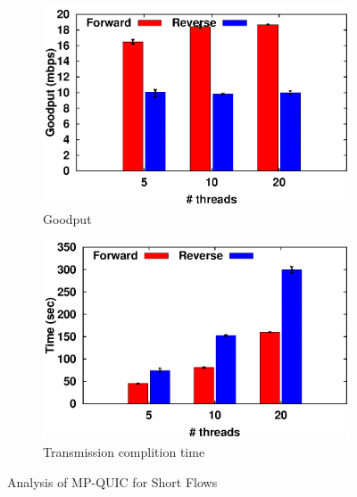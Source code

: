 \begin{figure}[!t]
	\begin{center}
		\begin{subfigure}{.46\linewidth}
			\includegraphics[width=0.95\linewidth]{img/mpquic-prob/goodPut-5.eps}
			\caption{\label{fig:Goodput-mpquic}Goodput}
		\end{subfigure}
		\hspace{0.1cm}
		\begin{subfigure}{.46\linewidth}
			\includegraphics[width=0.95\linewidth]{img/mpquic-prob/tymdiff-5.eps}
			\caption{\label{fig:flowcomplition-mpquic}Transmission complition time}
		\end{subfigure}
		
		\caption{Analysis of MP-QUIC for Short Flows\label{fig:mpquic-back}}
	\end{center}
\end{figure}

